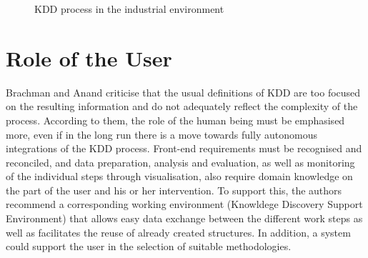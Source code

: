 \begin{figure} [H]
\begin{center}
  \caption{KDD process in the industrial environment}\label{KDDAnwendung}
\end{center}
\end{figure}


\section{Role of the User}

Brachman and Anand \cite{Brachman:1994} criticise that the usual definitions of KDD are too focused on the resulting information and do not adequately reflect the complexity of the process. According to them, the role of the human being must be emphasised more, even if in the long run there is a move towards fully autonomous integrations of the KDD process. Front-end requirements must be recognised and reconciled, and data preparation, analysis and evaluation, as well as monitoring of the individual steps through visualisation, also require domain knowledge on the part of the user and his or her intervention. To support this, the authors recommend a corresponding working environment (Knowldege Discovery Support Environment) that allows easy data exchange between the different work steps as well as facilitates the reuse of already created structures. In addition, a system could support the user in the selection of suitable methodologies.

